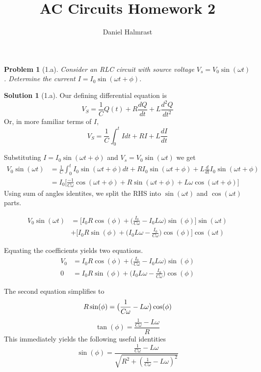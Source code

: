 \documentclass[12pt]{article}
\newtheorem*{problem}{Problem}
\theoremstyle{definition}
\newtheorem*{solution}{Solution}
\begin{document}
\title{AC Circuits Homework 2}
\author{Daniel Halmrast}
\maketitle

\begin{problem}[1.a]
Consider an RLC circuit with source voltage $V_s = V_0 \sin(\omega t)$.
Determine the current $I = I_0 \sin(\omega t + \phi)$.
\end{problem}

\begin{solution}[1.a]
Our defining differential equation is
\[
	V_S = \frac{1}{C}Q(t) + R\frac{dQ}{dt} + L\frac{d^2Q}{dt^2}
\]
Or, in more familiar terms of $I$,
\[
	V_S = \frac{1}{C}\int_0^t Idt + RI + L\frac{dI}{dt}
\]

Substituting $I = I_0 \sin(\omega t + \phi)$ and $V_s = V_0 \sin(\omega t)$ we get
\[
\begin{aligned}
	V_0 \sin(\omega t) 
	& = \frac{1}{C}\int_0^t I_0 \sin(\omega t + \phi)dt + R I_0 \sin(\omega t + \phi)+ L\frac{d}{dt}I_0 \sin(\omega t + \phi)\\
	& = I_0 \Big[ \frac{-1}{C\omega}\cos(\omega t + \phi) + R \sin(\omega t + \phi) + L\omega \cos(\omega t + \phi)\Big]
\end{aligned}
\]
Using sum of angles identites, we split the RHS into $\sin(\omega t)$ and $\cos(\omega t)$ parts.

\[
\begin{aligned}
	V_0 \sin(\omega t) 
	& = \Big[ I_0R\cos(\phi) + \big(\frac{I_0}{C\omega}-I_0L\omega\big)\sin(\phi) \Big]\sin(\omega t)\\
	& + \Big[ I_0R\sin(\phi) + \big(I_0L\omega-\frac{I_0}{C\omega}\big)\cos(\phi) \Big]\cos(\omega t)
\end{aligned}
\]

Equating the coefficients yields two equations.
\[
\begin{aligned}
V_0 & = I_0R\cos(\phi) + \big(\frac{I_0}{C\omega}-I_0L\omega\big)\sin(\phi)\\
0   & = I_0R\sin(\phi) + \big(I_0L\omega-\frac{I_0}{C\omega}\big)\cos(\phi)
\end{aligned}
\]

The second equation simplifies to
\[
R\sin(\phi) = \big(\frac{1}{C\omega}-L\omega\big)\cos(\phi)\\
\]
\begin{equation}
\boxed{\tan(\phi) = \frac{\frac{1}{C\omega}-L\omega}{R}}
\end{equation}
This immediately yields the following useful identities
\begin{equation}
\sin(\phi) = \frac{\frac{1}{C\omega}-L\omega}{\sqrt{R^2 + (\frac{1}{C\omega}-L\omega)^2}}
\end{equation}


\end{solution}
\end{document}
